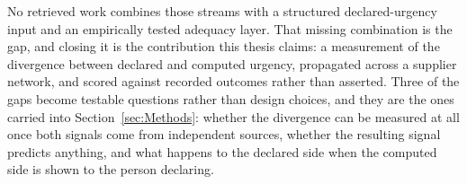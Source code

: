 No retrieved work combines those streams with a structured declared-urgency input and an
empirically tested adequacy layer. That missing combination is the gap, and closing it is the
contribution this thesis claims: a measurement of the divergence between declared and computed
urgency, propagated across a supplier network, and scored against recorded outcomes rather than
asserted. Three of the gaps become testable questions rather than design choices, and they are
the ones carried into Section~\ref{sec:Methods}: whether the divergence can be measured at all
once both signals come from independent sources, whether the resulting signal predicts
anything, and what happens to the declared side when the computed side is shown to the person
declaring.
